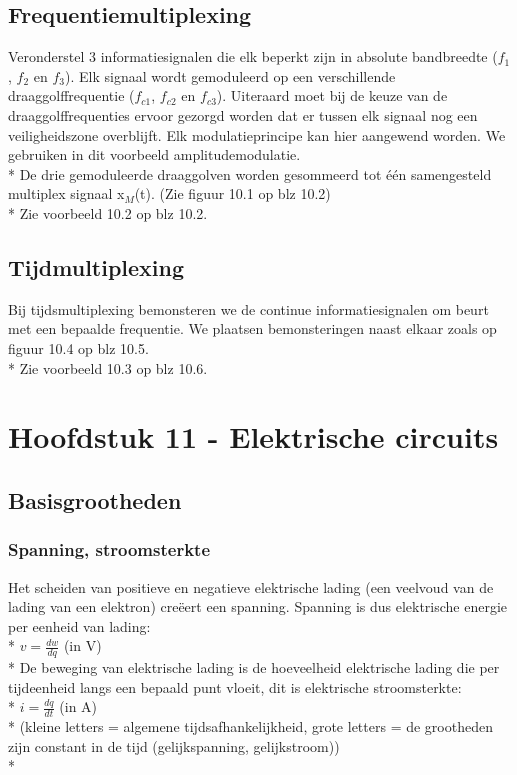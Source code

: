 \documentclass[10pt]{article}
\begin{document}
\subsection{Frequentiemultiplexing}
Veronderstel 3 informatiesignalen die elk beperkt zijn in absolute bandbreedte ($f_1$, $f_2$ en $f_3$). Elk signaal wordt gemoduleerd op een verschillende draaggolffrequentie ($f_{c1}$, $f_{c2}$ en $f_{c3}$). Uiteraard moet bij de keuze van de draaggolffrequenties ervoor gezorgd worden dat er tussen elk signaal nog een veiligheidszone overblijft. Elk modulatieprincipe kan hier aangewend worden. We gebruiken in dit voorbeeld amplitudemodulatie.\\*
De drie gemoduleerde draaggolven worden gesommeerd tot \'e\'en samengesteld multiplex signaal x$_M$(t). {\scriptsize (Zie figuur 10.1 op blz 10.2)}\\*
{\scriptsize Zie voorbeeld 10.2 op blz 10.2.}
\subsection{Tijdmultiplexing}
Bij tijdsmultiplexing bemonsteren we de continue informatiesignalen om beurt met een bepaalde frequentie. We plaatsen bemonsteringen naast elkaar zoals op figuur 10.4 op blz 10.5.\\*
{\scriptsize Zie voorbeeld 10.3 op blz 10.6.}
\section{Hoofdstuk 11 - Elektrische circuits}
\subsection{Basisgrootheden}
\subsubsection{Spanning, stroomsterkte}
Het scheiden van positieve en negatieve elektrische lading (een veelvoud van de lading van een elektron) cre\"eert een spanning. Spanning is dus elektrische energie per eenheid van lading:\\*
$v = \frac{dw}{dq}$ (in V)\\*
De beweging van elektrische lading is de hoeveelheid elektrische lading die per tijdeenheid langs een bepaald punt vloeit, dit is elektrische stroomsterkte:\\*
$i = \frac{dq}{dt}$ (in A)\\*
{\scriptsize (kleine letters = algemene tijdsafhankelijkheid, grote letters = de grootheden zijn constant in de tijd (gelijkspanning, gelijkstroom))}\\*
\end{document}
